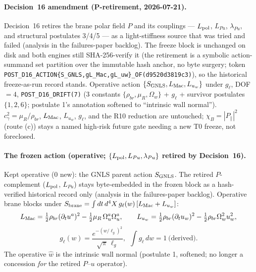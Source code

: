 \paragraph{Decision~16 amendment (P-retirement, 2026-07-21).}
Decision~16 retires the brane polar field \(P\) and its couplings ---
\(L_{\rm pol}\), \(L_{Pu}\), \(\lambda_{Pu}\), and structural postulates 3/4/5
--- as a light-stiffness source that was tried and failed (analysis in the
failures-paper backlog). The freeze block is unchanged on disk and both engines
still SHA-256-verify it (the retirement is a symbolic action-summand set partition
over the immutable hash anchor, no byte surgery; token
\texttt{POST\_D16\_ACTION\{S\_GNLS,gL\_Mac,gL\_uw\}\_OF(d9520d3819c3)}), so the
historical freeze-as-run record stands. Operative action
\(\{S_{\rm GNLS},L_{\rm Mac},L_{u_w}\}\) under \(g_\ell\), DOF\(=4\),
\texttt{POST\_D16\_DRIFT(7)} (3 constants \(\{\rho_{br},\mu_R,\Omega_w\}\) +
\(g_\ell\) + survivor postulates \(\{1,2,6\}\); postulate 1's annotation softened
to ``intrinsic wall normal''). \(c_\gamma^2=\mu_R/\rho_{br}\), \(L_{\rm Mac}\),
\(L_{u_w}\), \(g_\ell\), and the R10 reduction are untouched;
\(\chi_B=|P_\parallel|^2\) (route (c)) stays a named high-risk future gate needing
a new T0 freeze, not foreclosed.

\paragraph{The frozen action (operative; \(\{L_{\rm pol},L_{Pu},\lambda_{Pu}\}\) retired by Decision~16).}
Kept operative (0 new): the GNLS parent action \(S_{\rm GNLS}\). The retired
\(P\)-complement (\(L_{\rm pol}\), \(L_{Pu}\)) stays byte-embedded in the frozen
block as a hash-verified historical record only (analysis in the failures-paper
backlog). Operative brane blocks under
\(S_{\rm brane}=\int dt\,d^4X\, g_\ell(w)\,[L_{\rm Mac}+L_{u_w}]\):
\[
  L_{\rm Mac}=\tfrac12\rho_{br}(\partial_t u^a)^2-\tfrac12\mu_R\,\Omega_u^a\Omega_u^a,
  \qquad
  L_{u_w}=\tfrac12\rho_{br}(\partial_t u_w)^2-\tfrac12\rho_{br}\Omega_w^2 u_w^2,
\]
\[
  g_\ell(w)=\frac{e^{-(w/\ell_g)^2}}{\sqrt{\pi}\,\ell_g},\ \ \int g_\ell\,dw=1
  \ \text{(derived)}.
\]
The operative \(\hat w\) is the intrinsic wall normal (postulate 1, softened; no
longer a concession \emph{for} the retired \(P\)--\(u\) operator).

